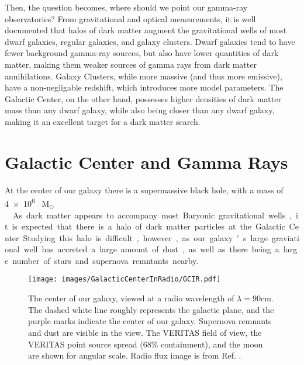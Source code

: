   Then, the question becomes, where should we point our gamma-ray observatories?
  From gravitational and optical measurements, it is well documented that halos of dark matter augment the gravitational wells of most dwarf galaxies, regular galaxies, and galaxy clusters.
  Dwarf galaxies tend to have fewer background gamma-ray sources, but also have lower quantities of dark matter, making them weaker sources of gamma rays from dark matter annihilations.
  Galaxy Clusters, while more massive (and thus more emissive), have a non-negligable redshift, which introduces more model parameters.
  The Galactic Center, on the other hand, possesses higher densities of dark matter mass than any dwarf galaxy, while also being closer than any dwarf galaxy, making it an excellent target for a dark matter search.


\section{Galactic Center and Gamma Rays}

  At the center of our galaxy there is a supermassive black hole, with a mass of \SI{4e6}{ M${{}_\odot}$ }~\cite{sgra_massdist}.
  As dark matter appears to accompany most Baryonic gravitational wells, it is expected that there is a halo of dark matter particles at the Galactic Center.
  Studying this halo is difficult, however, as our galaxy's large graviational well has accreted a large amount of dust, as well as there being a large number of stars and supernova remntants nearby.

  \begin{figure}[!t]
    \centering
    \texttt{[image: images/GalacticCenterInRadio/GCIR.pdf]}
    \caption[Galactic Center in Radio]{
      The center of our galaxy, viewed at a radio wavelength of $\lambda=90\text{cm}$.
      The dashed white line roughly represents the galactic plane, and the purple marks indicate the center of our galaxy.
      Supernova remnants and dust are visible in the view.
      The VERITAS field of view, the VERITAS point source spread (68\% containment), and the moon are shown for angular scale.
      Radio flux image is from Ref. \cite{galactic_center_in_radio}.
      \CaptionBlankLine
    }
    \label{fig_gc_radio}
  \end{figure}

